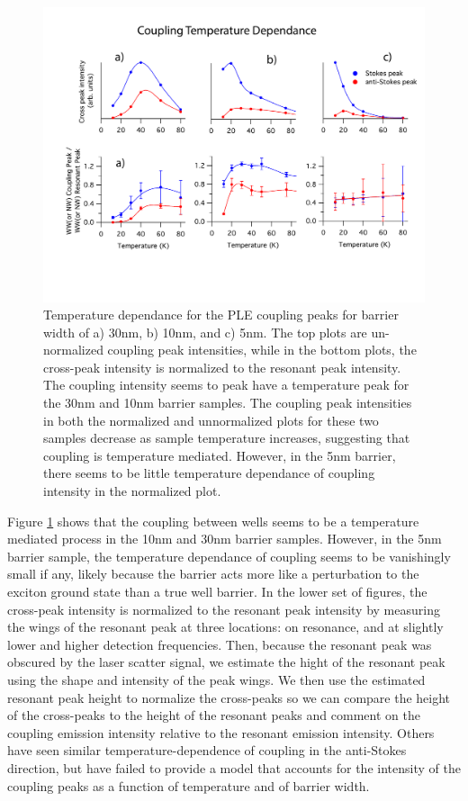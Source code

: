 \begin{figure}[!h]
\centering
\includegraphics[width = .7\textwidth]{Layoutple2.pdf}
\caption{ \doublespacing Temperature dependance for the PLE coupling peaks for barrier width of a) 30nm, b) 10nm, and c) 5nm. The top plots are un-normalized coupling peak intensities, while in the bottom plots, the cross-peak intensity is normalized to the resonant peak intensity. The coupling intensity seems to peak have a temperature peak for the 30nm and 10nm barrier samples. The coupling peak intensities in both the normalized and unnormalized plots for these two samples decrease as sample temperature increases, suggesting that coupling is temperature mediated. However, in the 5nm barrier, there seems to be little temperature dependance of coupling intensity in the normalized plot.} 
\label{xpkintensity}
\end{figure}
\indent Figure \ref{xpkintensity} shows that the coupling between wells seems to be a temperature mediated process in the 10nm and 30nm barrier samples. However, in the 5nm barrier sample, the temperature dependance of coupling seems to be vanishingly small if any, likely because the barrier acts more like a perturbation to the exciton ground state than a true well barrier. In the lower set of figures, the cross-peak intensity is normalized to the resonant peak intensity by measuring the wings of the resonant peak at three locations: on resonance, and at slightly lower and higher detection frequencies. Then, because the resonant peak was obscured by the laser scatter signal, we estimate the hight of the resonant peak using the shape and intensity of the peak wings. We then use the estimated resonant peak height to normalize the cross-peaks so we can compare the height of the cross-peaks to the height of the resonant peaks and comment on the coupling emission intensity relative to the resonant emission intensity. Others have seen similar temperature-dependence of coupling in the anti-Stokes direction, \cite{borri} but have failed to provide a model that accounts for the intensity of the coupling peaks as a function of temperature and of barrier width. 

